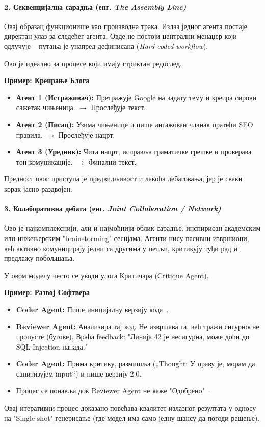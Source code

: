 \paragraph*{2. Секвенцијална сарадња (енг. \textit{The Assembly Line)}}
Овај образац функционише као производна трака. Излаз једног агента постаје директан улаз за следећег агента. Овде не постоји централни менаџер који одлучује – путања је унапред дефинисана (\textit{Hard-coded workflow}).

Ово је идеално за процесе који имају стриктан редослед.

\textbf{Пример: Креирање Блога}
\begin{itemize}
    \item \textbf{Агент 1 (Истраживач):} Претражује Google на задату тему и креира сирови сажетак чињеница. $\rightarrow$ Прослеђује текст.
    \item \textbf{Агент 2 (Писац):} Узима чињенице и пише ангажован чланак пратећи SEO правила. $\rightarrow$ Прослеђује нацрт.
    \item \textbf{Агент 3 (Уредник):} Чита нацрт, исправља граматичке грешке и проверава тон комуникације. $\rightarrow$ Финални текст.
\end{itemize}

Предност овог приступа је предвидљивост и лакоћа дебаговања, јер је сваки корак јасно раздвојен.

\paragraph*{3. Колаборативна дебата (енг. \textit{Joint Collaboration / Network)}}
Ово је најкомплекснији, али и најмоћнији облик сарадње, инспирисан академским или инжењерским "brainstorming" сесијама. Агенти нису пасивни извршиоци, већ активно комуницирају једни са другима у петљи, критикују туђи рад и предлажу побољшања.

У овом моделу често се уводи улога Критичара (Critique Agent).

\textbf{Пример: Развој Софтвера}
\begin{itemize}
    \item \textbf{Coder Agent:} Пише иницијалну верзију кода~\cite{chen2021codex}.
    \item \textbf{Reviewer Agent:} Анализира тај код. Не извршава га, већ тражи сигурносне пропусте (бугове). Враћа feedback: "Линија 42 је несигурна, може доћи до SQL Injection напада."
    \item \textbf{Coder Agent:} Прима критику, размишља („Thought: У праву је, морам да санитизујем input“) и пише верзију 2.0.
    \item Процес се понавља док Reviewer Agent не каже "Одобрено"~\cite{wang2023voyager}.
\end{itemize}
\noindent
Овај итеративни процес доказано повећава квалитет излазног резултата у односу на "Single-shot" генерисање (где модел има само једну шансу да погоди решење).

